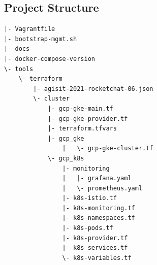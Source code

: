 \documentclass[12pt,a4paper,oneside]{report}
\begin{document}
\subsection{Project Structure}
\label{section:proj-structure}
\begin{verbatim}
|- Vagrantfile
|- bootstrap-mgmt.sh
|- docs
|- docker-compose-version
\- tools
    \- terraform
        |- agisit-2021-rocketchat-06.json
        \- cluster
            |- gcp-gke-main.tf
            |- gcp-gke-provider.tf
            |- terraform.tfvars
            |- gcp_gke
                |	\- gcp-gke-cluster.tf
            \- gcp_k8s
                |- monitoring
                |   |- grafana.yaml
                |   \- prometheus.yaml
                |- k8s-istio.tf
                |- k8s-monitoring.tf
                |- k8s-namespaces.tf
                |- k8s-pods.tf
                |- k8s-provider.tf
                |- k8s-services.tf
                \- k8s-variables.tf
\end{verbatim}
\end{document}
